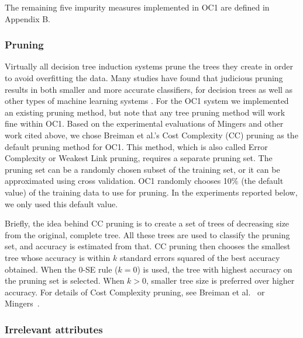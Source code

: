 The remaining five impurity measures implemented in OC1 are defined in
Appendix B.

\subsubsection{Pruning}
\label{section:pruning}
Virtually all decision tree induction systems prune the trees they
create in order to avoid overfitting the data.  Many studies have
found that judicious pruning results in both smaller and more accurate
classifiers, for decision trees as well as other types of machine
learning systems \cite{quinlan/87b,niblett/86,cestnik/etal/87,%
kodratoff/manago/87,cohen/93,hassibi/stork/93,wolpert/92,schaffer/93}.
For the OC1 system we implemented an existing pruning method, but note
that any tree pruning method will work fine within OC1.  Based on the
experimental evaluations of Mingers \citeyear{mingers/89b} and other
work cited above, we chose Breiman et al.'s Cost Complexity (CC)
pruning \citeyear{breiman/etal/84} as the default pruning method for OC1.
This method, which is also called Error Complexity or Weakest Link
pruning, requires a separate pruning set.  The pruning set can be a
randomly chosen subset of the training set, or it can be approximated
using cross validation.  OC1 randomly chooses 10\% (the default value)
of the training data to use for pruning.  In the experiments reported
below, we only used this default value.

Briefly, the idea behind CC pruning is to create a set of trees of
decreasing size from the original, complete tree.  All these trees are
used to classify the pruning set, and accuracy is estimated from that.
CC pruning then chooses the smallest tree whose accuracy is within $k$
standard errors squared of the best accuracy obtained.  When the 0-SE
rule ($k=0$) is used, the tree with highest accuracy on the pruning
set is selected. When $k>0$, smaller tree size is preferred over
higher accuracy.  For details of Cost Complexity pruning, see Breiman
et al.~\citeyear{breiman/etal/84} or Mingers~\citeyear{mingers/89b}.


\subsubsection{Irrelevant attributes}


